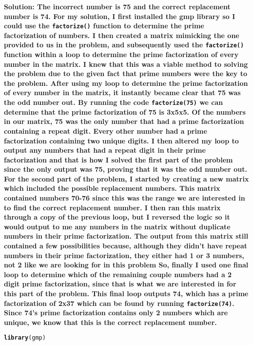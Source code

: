 \documentclass{article}\usepackage[]{graphicx}\usepackage[]{xcolor}
\makeatletter
\newcommand{\hldef}[1]{\textcolor[rgb]{0.345,0.345,0.345}{#1}}%
\newcommand{\hlkwd}[1]{\textcolor[rgb]{0.737,0.353,0.396}{\textbf{#1}}}%
\newenvironment{kframe}{%
 \def\at@end@of@kframe{}%
 \ifinner\ifhmode%
  \def\at@end@of@kframe{\end{minipage}}%
  \begin{minipage}{\columnwidth}%
 \fi\fi%
 \def\FrameCommand##1{\hskip\@totalleftmargin \hskip-\fboxsep
 \colorbox{shadecolor}{##1}\hskip-\fboxsep
     \hskip-\linewidth \hskip-\@totalleftmargin \hskip\columnwidth}%
 \MakeFramed {\advance\hsize-\width
   \@totalleftmargin\z@ \linewidth\hsize
   \@setminipage}}%
 {\par\unskip\endMakeFramed%
 \at@end@of@kframe}
\newenvironment{knitrout}{}{} %
\makeatother
\begin{document}
\begin{enumerate}
\textbf{Solution: The incorrect number is 75 and the correct replacement number is 74. For my solution, I first installed the gmp
library so I could use the \texttt{factorize()} function to determine the prime factorization of numbers. I then created a matrix mimicking the one  provided to us in the problem, and subsequently used the \texttt{factorize()} function within a loop to determine the prime factorization of every
number in the matrix. I knew that this was a viable method to solving the problem due to the given fact that prime numbers were the key to the problem. After using my loop to determine the prime factorization of every number in the matrix, it instantly became clear that 75 was the odd number out. By running the code \texttt{factorize(75)} we can determine that the prime factorization of 75 is 3x5x5. Of the numbers in our matrix, 75 was the only number that had a prime factorization containing a repeat digit. Every other number had a prime factorization containing two unique digits. I then altered my loop to output any numbers that had a repeat digit in their prime factorization and that is how I solved the first part of the problem since the only output was 75, proving that it was the odd number out. For the second part of the problem, I started by creating a new matrix which included the possible replacement numbers. This matrix contained numbers 70-76 since this was the range we are interested in to find the correct replacement number. I then ran this matrix through a copy of the previous loop, but I reversed the logic so it would output to me any numbers in the matrix without duplicate numbers in their prime factorization. The output from this matrix still contained a few possibilities because, although they didn't have repeat numbers in their prime factorization, they either had 1 or 3 numbers, not 2 like we are looking for in this problem So, finally I used one final loop to determine which of the remaining couple numbers had a 2 digit prime factorization, since that is what we are interested in for this part of the problem. This final loop outputs 74, which has a prime factorization of 2x37 which can be found by running \texttt{factorize(74)}. Since 74's prime factorization contains only 2 numbers which are unique, we know that this is the correct replacement number.}

\begin{knitrout}\scriptsize
{}\color{fgcolor}\begin{kframe}
\begin{alltt}
\hlkwd{library}\hldef{(gmp)}


\end{alltt}
\end{kframe}
\end{knitrout}
\end{enumerate}
\end{document}
